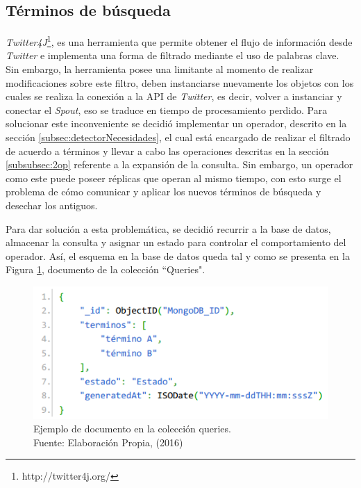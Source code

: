 \subsection{Términos de búsqueda}
\label{sec:diseno:termBusqueda}

\textit{Twitter4J}\footnote{http://twitter4j.org/}, es una herramienta que permite obtener el flujo de información desde \textit{Twitter} e implementa una forma de filtrado mediante el uso de palabras clave. Sin embargo, la herramienta posee una limitante al momento de realizar modificaciones sobre este filtro, deben instanciarse nuevamente los objetos con los cuales se realiza la conexión a la API de \textit{Twitter}, es decir, volver a instanciar y conectar el \textit{Spout}, eso se traduce en tiempo de procesamiento perdido. Para solucionar este inconveniente se decidió implementar un operador, descrito en la sección \ref{subsec:detectorNecesidades}, el cual está encargado de realizar el filtrado de acuerdo a términos y llevar a cabo las operaciones descritas en la sección \ref{subsubsec:2op} referente a la expansión de la consulta. Sin embargo, un operador como este puede poseer réplicas que operan al mismo tiempo, con esto surge el problema de cómo comunicar y aplicar los nuevos términos de búsqueda y desechar los antiguos.

Para dar solución a esta problemática, se decidió recurrir a la base de datos, almacenar la consulta y asignar un estado para controlar el comportamiento del operador. Así, el esquema en la base de datos queda tal y como se presenta en la Figura \ref{fig:esquemaQuery}, documento de la colección ``Queries".

\begin{figure}[H]
	\centering
	\captionsetup{justification=centering}
	\includegraphics[scale=0.8]{images/Query.png}
	\caption[Ejemplo de documento en la colección queries.]{Ejemplo de documento en la colección queries.\\Fuente: Elaboración Propia, (2016)}
	\label{fig:esquemaQuery}
\end{figure}

